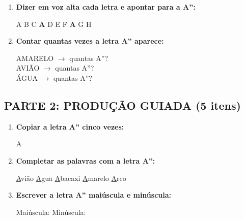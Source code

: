 \begin{exercicio}
\begin{enumerate}
  \item \textbf{Dizer em voz alta cada letra e apontar para a A'':}
  \begin{center}
  A \quad B \quad C \quad \textbf{A} \quad D \quad E \quad F \quad \textbf{A} \quad G \quad H
  \end{center}

  \item \textbf{Contar quantas vezes a letra A'' aparece:}
  \begin{center}
  AMARELO $\rightarrow$ quantas A''? \underline{\hspace{1cm}} \\
  AVIÃO $\rightarrow$ quantas A''? \underline{\hspace{1cm}} \\
  ÁGUA $\rightarrow$ quantas A''? \underline{\hspace{1cm}}
  \end{center}
\end{enumerate}

\subsection*{PARTE 2: PRODUÇÃO GUIADA (5 itens)}

\begin{enumerate}[resume]
  \item \textbf{Copiar a letra A'' cinco vezes:}
  \begin{center}
  A \quad \underline{\hspace{1.5cm}} \quad \underline{\hspace{1.5cm}} \quad \underline{\hspace{1.5cm}} \quad \underline{\hspace{1.5cm}} \quad \underline{\hspace{1.5cm}}
  \end{center}

  \item \textbf{Completar as palavras com a letra A'':}
  \begin{center}
  \underline{A}vião \quad \underline{A}gua \quad \underline{A}bacaxi \quad \underline{A}marelo \quad \underline{A}rco
  \end{center}

  \item \textbf{Escrever a letra A'' maiúscula e minúscula:}
  \begin{center}
  Maiúscula: \underline{\hspace{2cm}} \quad Minúscula: \underline{\hspace{2cm}}
  \end{center}


\end{enumerate}
\end{exercicio}
